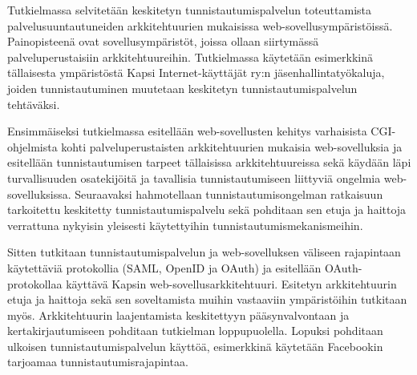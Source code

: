 Tutkielmassa selvitetään keskitetyn tunnistautumispalvelun toteuttamista palvelusuuntautuneiden arkkitehtuurien mukaisissa web-sovellusympäristöissä. Painopisteenä ovat sovellusympäristöt, joissa ollaan siirtymässä palveluperustaisiin arkkitehtuureihin. Tutkielmassa käytetään esimerkkinä tällaisesta ympäristöstä Kapsi Internet-käyttäjät ry:n jäsenhallintatyökaluja, joiden tunnistautuminen muutetaan keskitetyn tunnistautumispalvelun tehtäväksi.

Ensimmäiseksi tutkielmassa esitellään web-sovellusten kehitys varhaisista CGI-ohjelmista kohti palveluperustaisten arkkitehtuurien mukaisia web-sovelluksia ja esitellään tunnistautumisen tarpeet tällaisissa arkkitehtuureissa sekä käydään läpi turvallisuuden osatekijöitä ja tavallisia tunnistautumiseen liittyviä ongelmia web-sovelluksissa. Seuraavaksi hahmotellaan tunnistautumisongelman ratkaisuun tarkoitettu keskitetty tunnistautumispalvelu sekä pohditaan sen etuja ja haittoja verrattuna nykyisin yleisesti käytettyihin tunnistautumismekanismeihin.

Sitten tutkitaan tunnistautumispalvelun ja web-sovelluksen väliseen rajapintaan käytettäviä protokollia (SAML, OpenID ja OAuth) ja esitellään OAuth-protokollaa käyttävä Kapsin web-sovellusarkkitehtuuri. Esitetyn arkkitehtuurin etuja ja haittoja sekä sen soveltamista muihin vastaaviin ympäristöihin tutkitaan myös. Arkkitehtuurin laajentamista keskitettyyn pääsynvalvontaan ja kertakirjautumiseen pohditaan tutkielman loppupuolella. Lopuksi pohditaan ulkoisen tunnistautumispalvelun käyttöä, esimerkkinä käytetään Facebookin tarjoamaa tunnistautumisrajapintaa.